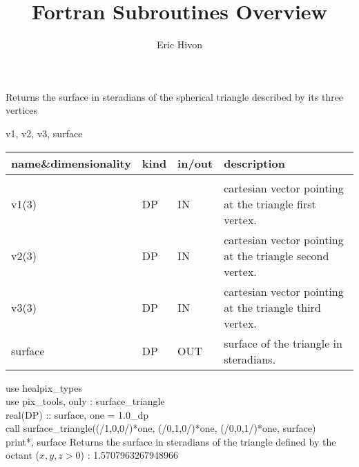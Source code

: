 
\sloppy


\title{\healpix Fortran Subroutines Overview}
 \section[surface\_triangle]{ }
\label{sub:surface_triangle}
\author{Eric Hivon}

\begin{facility}
{Returns the surface in steradians of the spherical triangle described by its
three vertices} 
{\modPixTools}
\end{facility}

\begin{f90format}
{v1, v2, v3, surface}
\end{f90format}

\begin{arguments}
{
\begin{tabular}{p{0.25\hsize} p{0.05\hsize} p{0.1\hsize} p{0.5\hsize}} \hline 
\textbf{name\&dimensionality} & \textbf{kind} & \textbf{in/out} & \textbf{description} \\ \hline
                   &   &   &                           \\ %
v1(3) & DP & IN & cartesian vector pointing at the triangle first vertex. \\
v2(3) & DP & IN & cartesian vector pointing at the triangle second vertex. \\
v3(3) & DP & IN & cartesian vector pointing at the triangle third vertex. \\
surface & DP & OUT & surface of the triangle in steradians.
\end{tabular}
}
\end{arguments}

\begin{example}
{
use healpix\_types \\
use pix\_tools,    only : surface\_triangle \\
real(DP) :: surface, one = 1.0\_dp \\
call surface\_triangle((/1,0,0/)*one, (/0,1,0/)*one, (/0,0,1/)*one, surface)  \\
print*, surface
}
{
Returns the surface in steradians of the triangle defined by the octant ($x,y,z>0$) : 1.5707963267948966
}
\end{example}

